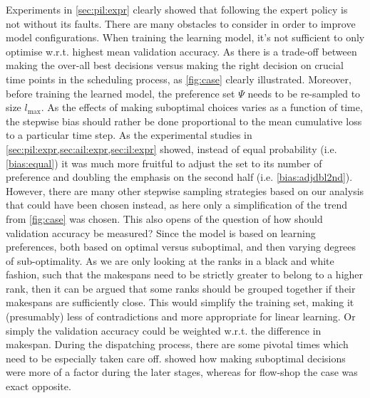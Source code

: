 \documentclass[twocolumn]{svjour3}
\begin{document}
Experiments in \cref{sec:pil:expr} clearly showed that following the expert 
policy is not without its faults. There are many obstacles to consider in order 
to improve model configurations. 
When training the learning model, it's not sufficient to only optimise w.r.t. 
highest mean validation accuracy. As there is a trade-off between making the 
over-all best decisions versus making the right decision on crucial time points 
in the scheduling process, as \cref{fig:case} clearly illustrated. 
Moreover, before training the learned model, the preference set $\Psi$ 
needs to be re-sampled to size $l_{\max}$. 
As the effects of making suboptimal choices varies as a function of time, the 
stepwise bias should rather be done proportional to the mean 
cumulative loss to a particular time step. 
As the experimental studies in \cref{sec:pil:expr,sec:ail:expr,sec:il:expr} 
showed, instead of equal probability (i.e. \ref{bias:equal}) it was much more 
fruitful to adjust the set to its number of preference and doubling the 
emphasis on the second half (i.e. \ref{bias:adjdbl2nd}).
However, there are many other stepwise sampling strategies based on our 
analysis that could have been chosen instead, as here only a 
simplification of the trend from \cref{fig:case} was chosen. 
This also opens of the question of how should validation accuracy be measured? 
Since the model is based on learning preferences, both based on optimal versus 
suboptimal, and then varying degrees of sub-optimality. As we are only looking 
at the ranks in a black and white fashion, such that the makespans need to be 
strictly greater to belong to a higher rank, then it can be argued that some 
ranks should be grouped together if their makespans are sufficiently close. 
This would simplify the training set, making it (presumably) less of 
contradictions and more appropriate for linear learning. Or simply the 
validation accuracy could be weighted w.r.t. the  difference in 
makespan.
During the dispatching process, there are some pivotal times which need to be 
especially taken care off.  showed how making suboptimal 
decisions were more of a factor during the later stages, whereas for flow-shop 
the case was exact opposite. 
\end{document}
